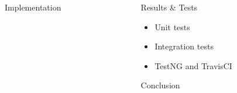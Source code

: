 \documentclass[final]{beamer} %
\begin{document}
\begin{columns}
\begin{column}{.35\textwidth}
\begin{block}{Implementation}
		\end{block}
	\end{column}
	\begin{column}{.3\textwidth}
		\begin{block}{Results \& Tests}
			\begin{itemize}
				\item Unit tests
				\item Integration tests
				\item TestNG and TravisCI
			\end{itemize}
		\end{block}
		\begin{block}{Conclusion}
		\end{block}
	\end{column}
\end{columns}
\end{document}
